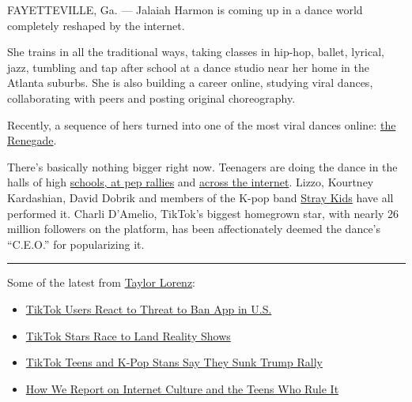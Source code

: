 FAYETTEVILLE, Ga. --- Jalaiah Harmon is coming up in a dance world
completely reshaped by the internet.

She trains in all the traditional ways, taking classes in hip-hop,
ballet, lyrical, jazz, tumbling and tap after school at a dance studio
near her home in the Atlanta suburbs. She is also building a career
online, studying viral dances, collaborating with peers and posting
original choreography.

Recently, a sequence of hers turned into one of the most viral dances
online: \href{https://www.youtube.com/watch?v=L2046dlkjQQ}{the
Renegade}.

\begin{quote}
\end{quote}

There's basically nothing bigger right now. Teenagers are doing the
dance in the halls of high
\href{https://www.tiktok.com/@zoey_rene1213/video/6783451327117724934}{schools,
at pep rallies} and
\href{https://www.youtube.com/watch?v=L2046dlkjQQ}{across the internet}.
Lizzo, Kourtney Kardashian, David Dobrik and members of the K-pop band
\href{https://twitter.com/bangchannies/status/1225950060569075712}{Stray
Kids} have all performed it. Charli D'Amelio, TikTok's biggest homegrown
star, with nearly 26 million followers on the platform, has been
affectionately deemed the dance's ``C.E.O.'' for popularizing it.

\begin{center}\rule{0.5\linewidth}{\linethickness}\end{center}

Some of the latest from
\href{https://www.nytimes.com/by/taylor-lorenz}{Taylor Lorenz}:

\begin{itemize}
\item
  \href{https://www.nytimes.com/2020/07/10/style/tiktok-ban-us-users-influencers-taylor-lorenz.html}{TikTok
  Users React to Threat to Ban App in U.S.}
\item
  \href{https://www.nytimes.com/2020/07/09/style/tiktok-stars-race-to-land-reality-shows.html}{TikTok
  Stars Race to Land Reality Shows}
\item
  \href{https://www.nytimes.com/2020/06/21/style/tiktok-trump-rally-tulsa.html}{TikTok
  Teens and K-Pop Stans Say They Sunk Trump Rally}
\item
  \href{https://www.nytimes.com/2020/07/16/style/taylor-lorenz-internet-culture-reporting.html}{How
  We Report on Internet Culture and the Teens Who Rule It}
\end{itemize}

